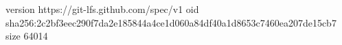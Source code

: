 version https://git-lfs.github.com/spec/v1
oid sha256:2c2bf3eec290f7da2e185844a4ce1d060a84df40a1d8653c7460ea207de15cb7
size 64014
